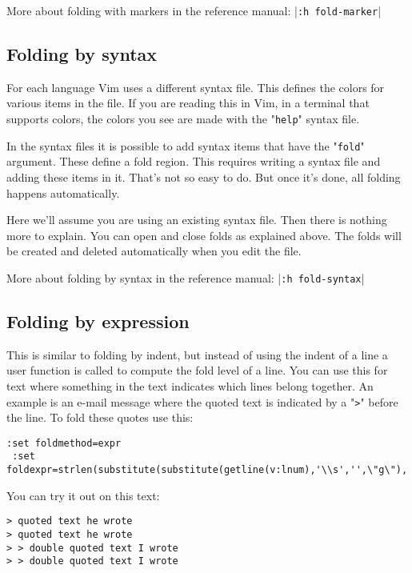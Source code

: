 More about folding with markers in the reference manual: |\texttt{:h fold-marker}|
\subsection{Folding by syntax}
For each language Vim uses a different syntax file.
This defines the colors for various items in the file.
If you are reading this in Vim, in a terminal that supports colors, the colors you see are made with the "\texttt{help}" syntax file.

In the syntax files it is possible to add syntax items that have the "\texttt{fold}" argument.
These define a fold region.
This requires writing a syntax file and adding these items in it.
That's not so easy to do.
But once it's done, all folding happens automatically.

Here we'll assume you are using an existing syntax file.
Then there is nothing more to explain.
You can open and close folds as explained above.
The folds will be created and deleted automatically when you edit the file.

More about folding by syntax in the reference manual: |\texttt{:h fold-syntax}|
\subsection{Folding by expression}
This is similar to folding by indent, but instead of using the indent of a line a user function is called to compute the fold level of a line.
You can use this for text where something in the text indicates which lines belong together.
An example is an e-mail message where the quoted text is indicated by a "\texttt{>}" before the line.
To fold these quotes use this:

\begin{Verbatim}[samepage=true]
 :set foldmethod=expr
 :set foldexpr=strlen(substitute(substitute(getline(v:lnum),'\\s','',\"g\"),'[^>].*','',''))
\end{Verbatim}

You can try it out on this text:

\begin{Verbatim}[samepage=true]
> quoted text he wrote
> quoted text he wrote
> > double quoted text I wrote
> > double quoted text I wrote
\end{Verbatim}

